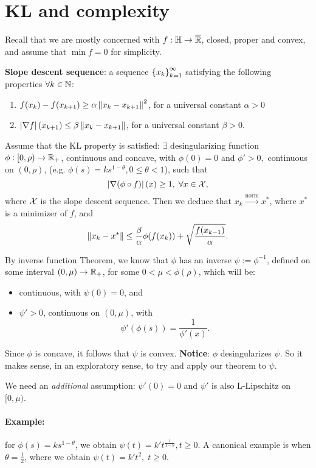 \section{KL and complexity}

Recall that we are mostly concerned with $f: \mathbb{H} \to \overline{\mathbb{R}}$, closed,
proper and convex, and assume that $\min f = 0$ for simplicity.

\textbf{Slope descent sequence}: a sequence $\left\{ x_k \right\}_{k=1}^{\infty}$
satisfying the following properties $\forall k \in \mathbb{N}$:
\begin{enumerate}
	\item $f(x_k) - f(x_{k+1}) \geq \alpha \left \| x_k - x_{k+1} \right \|^2$, for a
	universal constant $\alpha > 0$
	\item $\left| \nabla f \right|(x_{k+1}) \leq \beta \left \| x_k - x_{k+1} \right \|$, for a
	universal constant $\beta > 0$.
\end{enumerate}

Assume that the KL property is satisfied: $\exists$ desingularizing function
$\phi: [0, \rho) \to \mathbb{R}_+$, continuous and concave, with $\phi(0) = 0$ and
$\phi' > 0, $ continuous on $(0, \rho)$, (e.g. $\phi(s) = ks^{1- \theta},
0 \leq \theta < 1$), such that
\[
	\left| \nabla (\phi \circ f) \right|(x) \geq 1, \; \forall x \in \mathcal{X},
\]
where $\mathcal{X}$ is the slope descent sequence.
Then we deduce that $x_k \overset{\mathrm{norm}}{\to} x^*$, where $x^*$ is a
minimizer of $f$, and
\[
	\left \| x_k - x^* \right \| \leq \frac{\beta}{\alpha} \phi(f(x_k))
		+ \sqrt{\frac{f(x_{k-1})}{\alpha}}.
\]

By inverse function Theorem, we know that $\phi$ has an inverse $\psi :=
\phi^{-1}$, defined on some interval $(0, \mu) \to \mathbb{R}_+$, for some $0 < \mu <
\phi(\rho)$, which will be:
\begin{itemize}
	\item continuous, with $\psi(0) = 0$, and
	\item $\psi' > 0$, continuous on $(0, \mu)$, with
		\[
			\psi'(\phi(s)) = \frac{1}{\phi'(x)}.
		\]
\end{itemize}
Since $\phi$ is concave, it follows that $\psi$ is convex.
\textbf{Notice}: $\phi$ desingularizes $\psi$. So it makes sense, in an
exploratory sense, to try and apply our theorem to $\psi$.

We need an \textit{additional} assumption: $\psi'(0) = 0$ and $\psi'$ is also
L-Lipschitz on $[0, \mu)$.

\paragraph{Example:} for $\phi(s) = ks^{1 - \theta}$, we obtain $\psi(t) = k'
t^{\frac{1}{1 - \theta}}, t \geq 0$. A canonical example is when $\theta =
\frac{1}{2}$, where we obtain $\psi(t) = k' t^2, \; t \geq 0$.

